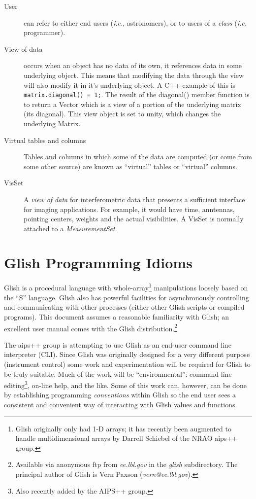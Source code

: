 \begin{description}
\item[User]
can refer to either end users ({\em i.e.}, astronomers), or to users
of a {\em class} ({\em i.e.} programmer).


\item[View of data]
occurs when an object has no data of its own, it references data in
some underlying object. This means that modifying the data through the
view will also modify it in it's underlying object. A C++ example of
this is {\tt matrix.diagonal() = 1;}. The result of the diagonal()
member function is to return a Vector which is a view of a portion of
the underlying matrix (its diagonal). This view object is set to
unity, which changes the underlying Matrix.


\item[Virtual tables and columns]
Tables and columns in which some of the data are computed (or come
from some other source) are known as ``virtual'' tables or ``virtual''
columns.


\item[VisSet] 
A {\em view of data} for interferometric data that presents a
sufficient interface for imaging applications. For example, it would
have time, anntennas, pointing centers, weights and the actual
visibilities. A VisSet is normally attached to a {\em MeasurementSet}.



\end{description}

\appendix

\section{Glish Programming Idioms}
Glish is a procedural language with whole-array\footnote{Glish
originally only had 1-D arrays; it has recently been augmented to
handle multidimensional arrays by Darrell Schiebel of the NRAO {\sc
{\sc aips++}} group.}  manipulations loosely based on the ``S''
language. Glish also has powerful facilities for asynchronously
controlling and communicating with other processes (either other Glish
scripts or compiled programs). This document assumes a reasonable
familiarity with Glish; an excellent user manual comes with the Glish
distribution.\footnote{Available via anonymous ftp from {\em
ee.lbl.gov} in the {\em glish} subdirectory. The principal author of
Glish is Vern Paxson ({\em vern@ee.lbl.gov}).}

The {\sc aips++} group is attempting to use Glish as an end-user
command line interpreter (CLI). Since Glish was originally designed
for a very different purpose (instrument control) some work and
experimentation will be required for Glish to be truly suitable. Much
of the work will be ``environmental'': command line
editing\footnote{Also recently added by the {\sc AIPS++} group.},
on-line help, and the like. Some of this work can, however, can be
done by establishing programming {\em conventions} within Glish so the
end user sees a consistent and convenient way of interacting with
Glish values and functions.
